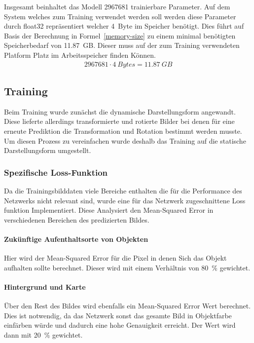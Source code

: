 \documentclass[12pt]{article}
\begin{document}
            Insgesamt beinhaltet das Modell 2967681 trainierbare Parameter. 
            Auf dem System welches zum Training verwendet werden soll werden diese Parameter durch float32 repräsentiert welcher 4~Byte im Speicher benötigt.
            Dies führt auf Basis der Berechnung in Formel~\ref{memory-size} zu einem minimal benötigten Speicherbedarf von 11.87~GB. 
            Dieser muss auf der zum Training verwendeten Platform Platz im Arbeitsspeicher finden Können.
            \begin{align}
                2967681 \cdot 4~Bytes = 11.87~GB
                \label{memory-size}
            \end{align}
    \subsection{Training}
        Beim Training wurde zunächst die dynamische Darstellungsform angewandt. 
        Diese lieferte allerdings transformierte und rotierte Bilder bei denen für eine erneute Prediktion die Transformation und Rotation bestimmt werden musste. 
        Um diesen Prozess zu vereinfachen wurde deshalb das Training auf die statische Darstellungsform umgestellt.
        \subsubsection{Spezifische Loss-Funktion}
	        Da die Trainingsbilddaten viele Bereiche enthalten die für die Performance des Netzwerks nicht relevant sind, 
            wurde eine für das Netzwerk zugeschnittene Loss funktion Implementiert. 
            Diese Analysiert den Mean-Squared Error in verschiedenen Bereichen des predizierten Bildes. 
            \paragraph{Zukünftige Aufenthaltsorte von Objekten} Hier wird der Mean-Squared Error für die Pixel in denen Sich das Objekt aufhalten sollte berechnet. 
            Dieser wird mit einem Verhältnis von 80~\% gewichtet.
            \paragraph{Hintergrund und Karte} Über den Rest des Bildes wird ebenfalls ein Mean-Squared Error Wert berechnet. 
            Dies ist notwendig, da das Netzwerk sonst das gesamte Bild in Objektfarbe einfärben würde und dadurch eine hohe Genauigkeit erreicht.
            Der Wert wird dann mit 20~\% gewichtet.
\end{document}
